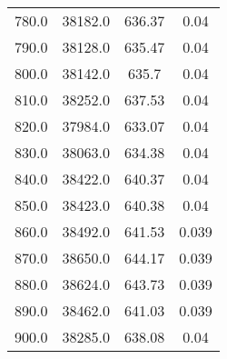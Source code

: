 \begin{table}
\begin{tabular}{cccc}
780.0 & 38182.0 & 636.37 & 0.04 \\
790.0 & 38128.0 & 635.47 & 0.04 \\
800.0 & 38142.0 & 635.7 & 0.04 \\
810.0 & 38252.0 & 637.53 & 0.04 \\
820.0 & 37984.0 & 633.07 & 0.04 \\
830.0 & 38063.0 & 634.38 & 0.04 \\
840.0 & 38422.0 & 640.37 & 0.04 \\
850.0 & 38423.0 & 640.38 & 0.04 \\
860.0 & 38492.0 & 641.53 & 0.039 \\
870.0 & 38650.0 & 644.17 & 0.039 \\
880.0 & 38624.0 & 643.73 & 0.039 \\
890.0 & 38462.0 & 641.03 & 0.039 \\
900.0 & 38285.0 & 638.08 & 0.04 \\
\end{tabular}
\end{table}
